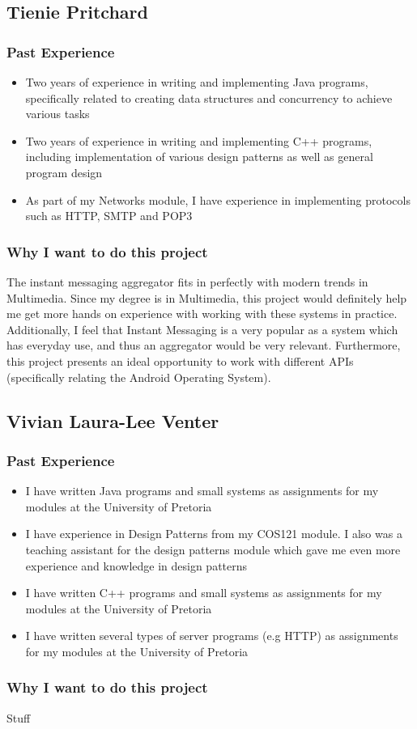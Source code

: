 \pagebreak
\subsection{Tienie Pritchard}

\subsubsection{Past Experience} 
\begin{itemize}
	\item{Two years of experience in writing and implementing Java programs, specifically related to creating data structures and concurrency to achieve various tasks}
	\item{Two years of experience in writing and implementing C++ programs, including implementation of various design patterns as well as general program design}
	\item{As part of my Networks module, I have experience in implementing protocols such as HTTP, SMTP and POP3}
\end{itemize}
\subsubsection{Why I want to do this project}
The instant messaging aggregator fits in perfectly with modern trends in Multimedia. Since my degree is in Multimedia, this project would definitely help me get more hands on experience with working with these systems in practice. Additionally, I feel that Instant Messaging is a very popular as a system which has everyday use, and thus an aggregator would be very relevant. Furthermore, this project presents an ideal opportunity to work with different APIs (specifically relating the Android Operating System).



\pagebreak
\subsection{Vivian Laura-Lee Venter}

\subsubsection{Past Experience} 
\begin{itemize}
	\item{I have written Java programs and small systems as assignments for my modules at the University of Pretoria}
	\item{I have experience in Design Patterns from my COS121 module. I also was a teaching assistant for the design patterns module which gave me even more experience and knowledge in design patterns}
	\item{I have written C++ programs and small systems as assignments for my modules at the University of Pretoria}
	\item{I have written several types of server programs (e.g HTTP) as assignments for my modules at the University of Pretoria}
\end{itemize}
\subsubsection{Why I want to do this project}
Stuff



